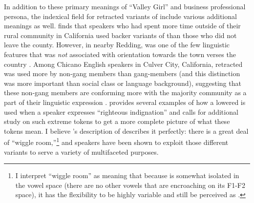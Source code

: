 In addition to these primary meanings of ``Valley Girl'' and business professional persona, the indexical field for retracted variants of \bat include various additional meanings as well. \citet{geenberg_2014_diss} finds that speakers who had spent more time outside of their rural community in California used backer variants of \bat than those who did not leave the county. However, in nearby Redding, \bat was one of the few linguistic features that was \textit{not} associated with orientation towards the town verses the country \citep{podesva_etal_2015}. Among Chicano English speakers in Culver City, California, retracted \bat was used more by non-gang members than gang-members (and this distinction was more important than social class or language background), suggesting that these non-gang members are conforming more with the majority community as a part of their linguistic expression \citep{fought_2003}. \citet[150]{vanhofwegen_2017_diss} provides several examples of how a lowered \bat is used when a speaker expresses ``righteous indignation'' and calls for additional study on such extreme tokens to get a more complete picture of what these tokens mean. I believe \citeauthor{pratt_etal_2018}'s \citeyearpar{pratt_etal_2018} description of \bat describes it perfectly: there is a great deal of ``wiggle room,''\footnote{I interpret ``wiggle room'' as meaning that because \trap is somewhat isolated in the vowel space (there are no other vowels that are encroaching on its F1-F2 space), it has the flexibility to be highly variable and still be perceived as \trap.} and speakers have been shown to exploit those different variants to serve a variety of multifaceted purposes.

